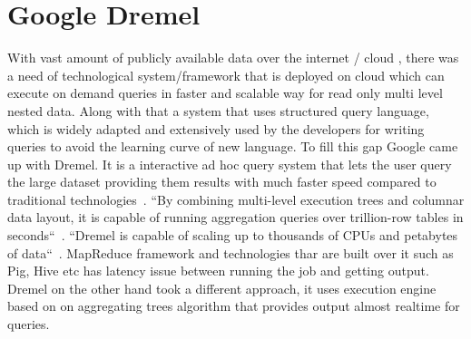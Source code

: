 \section{Google Dremel}


With vast amount of publicly available data over the internet / cloud , 
there was a need of technological system/framework that is deployed on 
cloud which can execute on demand queries in faster and scalable way 
for read only multi level nested data. Along with that a system that 
uses structured query language, which is widely adapted and extensively 
used by the developers for writing queries to avoid the learning curve of 
new language. To fill this gap Google came up with Dremel. It is a 
interactive ad hoc query system that lets the user query the large 
dataset providing them results with much faster speed compared to 
traditional technologies~\cite{hid-sp18-523-www-dremel}. ``By combining 
multi-level execution trees and columnar data layout, it is capable of 
running aggregation queries over trillion-row tables in 
seconds``~\cite{hid-sp18-523-www-dremel}. ``Dremel is capable of scaling 
up to thousands of CPUs and petabytes of data``~\cite{hid-sp18-523-www-dremel}.
MapReduce framework and technologies thar are built over it such as Pig, Hive 
etc has latency issue between running the job and getting output. 
Dremel on the other hand took a different approach, it uses execution engine
based on on aggregating trees algorithm that provides output almost realtime 
for queries.
